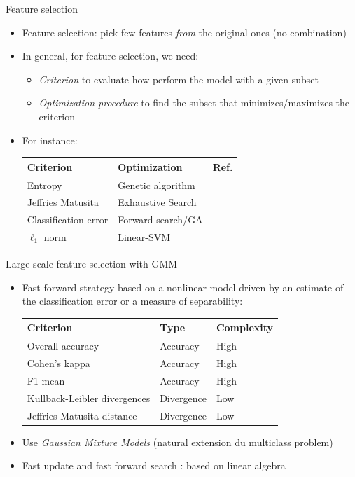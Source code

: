 \documentclass[10pt,aspectratio=1610]{beamer}
\begin{document}
\begin{frame}[label={sec:org71ab952}]{Feature selection}
\begin{itemize}
\item Feature selection: pick few features \emph{from} the original ones (no combination)
\item In general, for feature selection, we need:
\begin{itemize}
\item \emph{Criterion} to evaluate how perform the model with a given subset
\item \emph{Optimization   procedure}   to  find   the   subset   that  minimizes/maximizes the criterion
\end{itemize}
\item For instance:   
\begin{center}
\begin{tabular}{lll}
\toprule
Criterion & Optimization & Ref.\\
\midrule
Entropy & Genetic algorithm & \cite{chein2007hyperspectral}\\
Jeffries Matusita & Exhaustive Search & \cite{4069122}\\
Classification error & Forward search/GA & \cite{lebris:fs,7847352}\\
\(\ell_1\) norm & Linear-SVM & \cite{tuia2014automatic}\\
\bottomrule
\end{tabular}
\end{center}
\end{itemize}
\end{frame}

\begin{frame}[label={sec:org69e03a0}]{Large scale feature selection with GMM}
\begin{itemize}
\item Fast  forward strategy  based  on  a nonlinear  model  driven by  an
estimate of the classification error or a measure of separability:
\begin{center}
\begin{tabular}{lll}
\toprule
Criterion & Type & Complexity\\
\midrule
Overall accuracy & Accuracy & High\\
Cohen's kappa & Accuracy & High\\
F1 mean & Accuracy & High\\
\midrule
Kullback-Leibler divergences & Divergence & Low\\
Jeffries-Matusita distance & Divergence & Low\\
\bottomrule
\end{tabular}
\end{center}
\item Use \emph{Gaussian Mixture Models} (natural extension du multiclass problem)
\item Fast update and fast forward search \cite{7847352}: based on linear algebra
\end{itemize}
\end{frame}
\end{document}
